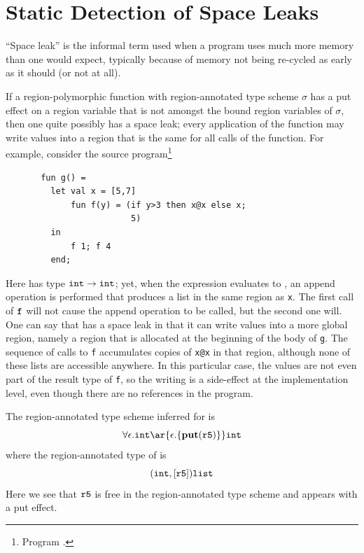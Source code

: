 \documentclass[12pt]{book}
\begin{document}
\chapter{Static Detection of Space Leaks}

\label{spaceleak.sec}
``Space leak'' is the informal term used when a program uses much
more memory than one would expect, typically because of memory not
being re-cycled as early as it should (or not at all).

If a region-polymorphic function with region-annotated type scheme $\sigma$
has a put effect on a region variable 
that is not amongst the bound region variables of $\sigma$, then
one quite possibly has a space leak; every application of the
function may write values into a region that is the same for
all calls of the function. For example, consider the 
source program\footnote{Program .}
\begin{verbatim}
       fun g() = 
         let val x = [5,7]
             fun f(y) = (if y>3 then x@x else x; 
                         5)
         in 
             f 1; f 4
         end;
\end{verbatim} 
Here  has type $\hbox{\tt int}\to\hbox{\tt int}$; yet, when the expression  evaluates
to , an append operation is performed that produces a list in the same region
as {\tt x}. The first call of $\hbox{\tt f}$ will not cause the
append operation to be called, but the second one will. One can say that
 has a space leak in that it can write values into a more
global region, namely a region that is allocated at the beginning of
the body of {\tt g}. The sequence of calls to {\tt f}
accumulates copies of {\tt x@x} in that region, although none of these
lists are accessible anywhere.
In this particular case, the values are not even part of 
the result type of {\tt f}, 
so the writing is a side-effect at the implementation level,
even though there are no references in the program.

The region-annotated type scheme inferred for  is
$$\forall\epsilon.\boxml{int} \ar{\epsilon.\{\Put(\mathtt{r5})\}} \boxml{int}$$
where the region-annotated type of  is
$$(\hbox{\tt int},[\hbox{\tt r5}])\hbox{\tt list}$$
Here we see that $\hbox{\tt r5}$ is free in the region-annotated type scheme and appears with a put effect.
\end{document}
